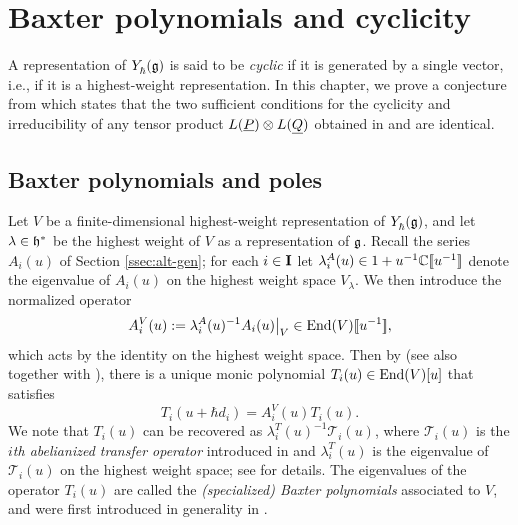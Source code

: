 \chapter{Baxter polynomials and cyclicity}\label{chap:baxter}

A representation of $Y_\hbar^{}(\mathfrak{g})$ is said to be \emph{cyclic} if it is generated by a single vector, i.e., if it is a highest-weight representation.
In this chapter, we prove a conjecture from \cite[\S 7.4]{gautam_poles_2023} which states that the two sufficient conditions for the cyclicity and irreducibility of any tensor product $L(\underline{P})\otimes L(\underline{Q})$ obtained in \cite{gautam_poles_2023} and \cite{tan_braid_2015} are identical.


\section{Baxter polynomials and poles}\label{sec:baxter-poles}

Let $V$ be a finite-dimensional highest-weight representation of $Y_\hbar^{}(\mathfrak{g})$, and let $\lambda\in\mathfrak{h}^*$ be the highest weight of $V$ as a representation of $\mathfrak{g}$.
Recall the series $A_i(u)$ of Section \ref{ssec:alt-gen}; for each $i\in\mathbf{I}$ let $\lambda_i^A(u)\in 1+u^{-1}\mathbb{C}[\![u^{-1}]\!]$ denote the eigenvalue of $A_i(u)$ on the highest weight space $V_\lambda$.
We then introduce the normalized operator
\[A_i^V(u) := \lambda_i^A(u)^{-1}A_i(u)\big|_V \in\operatorname{End}(V)[\![u^{-1}]\!],\]
which acts by the identity on the highest weight space.
Then by \cite[Thm. 4.4]{gautam_poles_2023} (see also \cite[Cor. 4.7]{gautam_poles_2023} together with \cite[Prop. 5.7, 5.8]{hernandez_shifted_2022}), there is a unique monic polynomial $T_i(u)\in\operatorname{End}(V)[u]$ that satisfies
\begin{equation}\label{eqn:transfer-op}
    T_i(u+\hbar d_i) = A_i^V(u)T_i(u).
\end{equation}
We note that $T_i(u)$ can be recovered as $\lambda_i^T(u)^{-1}\mathscr{T}_i(u)$, where $\mathscr{T}_i(u)$ is the \emph{$i$th abelianized transfer operator} introduced in \cite[\S 4.3]{gautam_poles_2023} and $\lambda_i^T(u)$ is the eigenvalue of $\mathscr{T}_i(u)$ on the highest weight space; see \cite[Remark 5.1]{friesen_braid_2024} for details.
The eigenvalues of the operator $T_i(u)$ are called the \emph{(specialized) Baxter polynomials} associated to $V$, and were first introduced in generality in \cite{frenkel_baxters_2015}.


